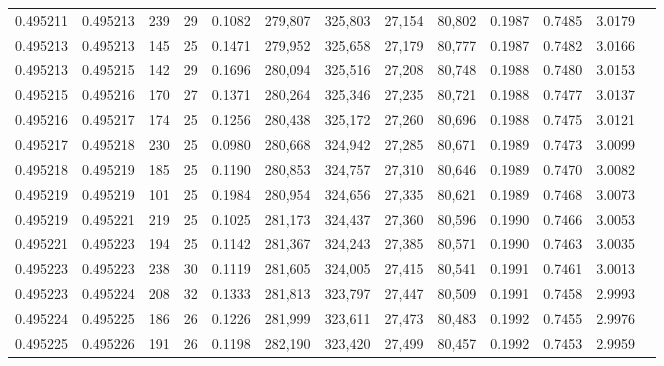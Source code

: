 \begin{tabular}{rrrrrrrrrrrrr}
0.495211 & 0.495213 & 239 &  29 &                                     0.1082 & 279,807 & 325,803 &  27,154 &  80,802 & 0.1987 & 0.7485 & 3.0179 \\
0.495213 & 0.495213 & 145 &  25 &                                     0.1471 & 279,952 & 325,658 &  27,179 &  80,777 & 0.1987 & 0.7482 & 3.0166 \\
0.495213 & 0.495215 & 142 &  29 &                                     0.1696 & 280,094 & 325,516 &  27,208 &  80,748 & 0.1988 & 0.7480 & 3.0153 \\
0.495215 & 0.495216 & 170 &  27 &                                     0.1371 & 280,264 & 325,346 &  27,235 &  80,721 & 0.1988 & 0.7477 & 3.0137 \\
0.495216 & 0.495217 & 174 &  25 &                                     0.1256 & 280,438 & 325,172 &  27,260 &  80,696 & 0.1988 & 0.7475 & 3.0121 \\
0.495217 & 0.495218 & 230 &  25 &                                     0.0980 & 280,668 & 324,942 &  27,285 &  80,671 & 0.1989 & 0.7473 & 3.0099 \\
0.495218 & 0.495219 & 185 &  25 &                                     0.1190 & 280,853 & 324,757 &  27,310 &  80,646 & 0.1989 & 0.7470 & 3.0082 \\
0.495219 & 0.495219 & 101 &  25 &                                     0.1984 & 280,954 & 324,656 &  27,335 &  80,621 & 0.1989 & 0.7468 & 3.0073 \\
0.495219 & 0.495221 & 219 &  25 &                                     0.1025 & 281,173 & 324,437 &  27,360 &  80,596 & 0.1990 & 0.7466 & 3.0053 \\
0.495221 & 0.495223 & 194 &  25 &                                     0.1142 & 281,367 & 324,243 &  27,385 &  80,571 & 0.1990 & 0.7463 & 3.0035 \\
0.495223 & 0.495223 & 238 &  30 &                                     0.1119 & 281,605 & 324,005 &  27,415 &  80,541 & 0.1991 & 0.7461 & 3.0013 \\
0.495223 & 0.495224 & 208 &  32 &                                     0.1333 & 281,813 & 323,797 &  27,447 &  80,509 & 0.1991 & 0.7458 & 2.9993 \\
0.495224 & 0.495225 & 186 &  26 &                                     0.1226 & 281,999 & 323,611 &  27,473 &  80,483 & 0.1992 & 0.7455 & 2.9976 \\
0.495225 & 0.495226 & 191 &  26 &                                     0.1198 & 282,190 & 323,420 &  27,499 &  80,457 & 0.1992 & 0.7453 & 2.9959 \\

\end{tabular}
